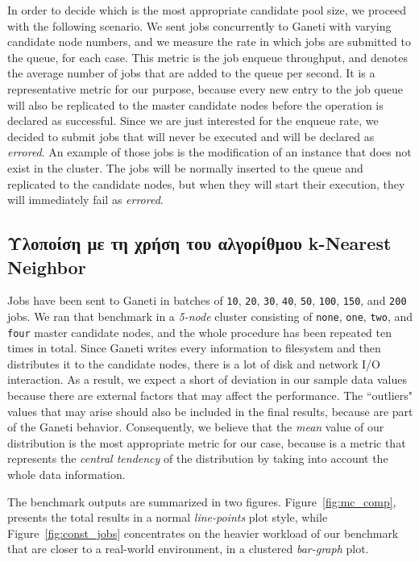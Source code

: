 In order to decide which is the most appropriate candidate pool size, we
proceed with the following scenario. We sent jobs concurrently to Ganeti with
varying candidate node numbers, and we measure the rate in which jobs are
submitted to the queue, for each case.
This metric is the job enqueue throughput, and denotes the average number
of jobs that are added to the queue per second. It is a representative metric
for our purpose, because every new entry to the job queue will also be
replicated to the master candidate nodes before the operation is declared as
successful. Since we are just
interested for the enqueue rate, we decided to submit jobs that will
never be executed and will be declared as \emph{errored}. An example of those
jobs is the modification of an instance that does not exist in the cluster. The
jobs will be normally inserted to the queue and replicated to the candidate
nodes, but when they will start their execution, they will immediately fail as
\emph{errored}.

\subsection{Υλοποίση με τη χρήση του αλγορίθμου k-Nearest Neighbor}\label{subsec:lbphknn}

Jobs have been sent to Ganeti in batches of \texttt{10}, \texttt{20},
\texttt{30}, \texttt{40}, \texttt{50}, \texttt{100}, \texttt{150}, and
\texttt{200} jobs. We ran that benchmark in a \emph{5-node} cluster consisting
of \texttt{none},
\texttt{one}, \texttt{two}, and \texttt{four} master candidate nodes, and the
whole procedure has been repeated ten times in total. Since Ganeti writes every
information to filesystem and then distributes it to the candidate nodes, there
is a lot of disk and network I/O interaction. As a result, we expect a short of
deviation in our sample data values because there are external factors that may
affect the performance. The ``outliers" values that may arise should also be
included in the final results, because are part of the Ganeti behavior.
Consequently, we believe that the \emph{mean} value of our distribution is the
most appropriate metric for our case, because is a metric that represents the
\emph{central tendency} of the distribution by taking into account the whole
data information.

The benchmark outputs are summarized in two figures. Figure~\ref{fig:mc_comp},
presents the total results in a normal \emph{line-points} plot style, while
Figure~\ref{fig:const_jobs} concentrates on the heavier workload of our
benchmark that are closer to a real-world environment, in a clustered
\emph{bar-graph} plot.

